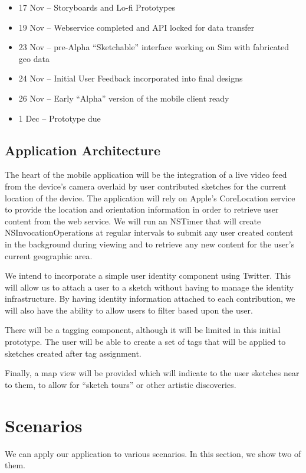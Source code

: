 \documentclass{www2010-submission}
\begin{document}
\begin{itemize}
\item 17 Nov -- Storyboards and Lo-fi Prototypes
\item 19 Nov -- Webservice completed and API locked for data transfer
\item 23 Nov -- pre-Alpha ``Sketchable'' interface working on Sim with fabricated geo data
\item 24 Nov -- Initial User Feedback incorporated into final designs
\item 26 Nov -- Early ``Alpha'' version of the mobile client ready
\item 1 Dec -- Prototype due

\end{itemize}

\subsection{ Application Architecture }

The heart of the mobile application will be the integration of a live video
feed from the device's camera overlaid by user contributed sketches for the
current location of the device.  The application will rely on Apple's
CoreLocation service to provide the location and orientation information in
order to retrieve user content from the web service.  We will run an NSTimer
that will create NSInvocationOperations at regular intervals to submit any user
created content in the background during viewing and to retrieve any new
content for the user's current geographic area.

We intend to incorporate a simple user identity component using Twitter.  This
will allow us to attach a user to a sketch without having to manage the
identity infrastructure.  By having identity information attached to each
contribution, we will also have the ability to allow users to filter based upon
the user.

There will be a tagging component, although it will be limited in this initial
prototype.  The user will be able to create a set of tags that will be applied
to sketches created after tag assignment.

Finally, a map view will be provided which will indicate to the user sketches
near to them, to allow for ``sketch tours'' or other artistic discoveries.

\section{Scenarios}
We can apply our application to various scenarios. In this section, we show two
of them.
\end{document}
